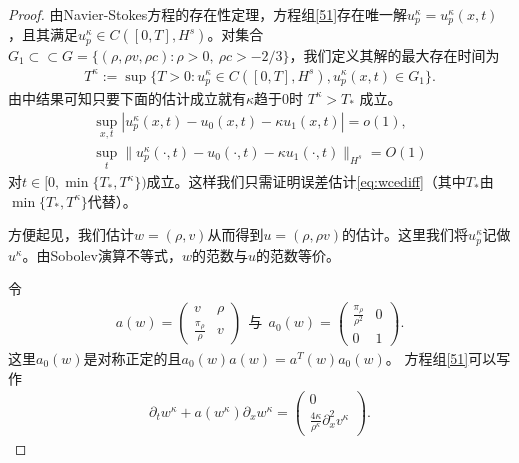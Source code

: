 \begin{proof}
由Navier-Stokes方程的存在性定理\cite{kawashima1984systems}，方程组\eqref{51}存在唯一解$u^\kappa_p=u^\kappa_p(x,t)$，且其满足$u^\kappa_p \in C([0,T],H^s)$。对集合$G_1\subset\subset G= \{(\rho, \rho v, \rho c): \rho>0,\ \rho c > -2/3\}$，我们定义其解的最大存在时间为
\begin{eqnarray*}
  T^\kappa :=\sup \{T>0 : u_p^\kappa  \in C([0,T],H^s), u^\kappa_p(x,t) \in G_1 \}.
\end{eqnarray*}
由\cite{yong2001basic}中结果可知只要下面的估计成立就有$\kappa$趋于$0$时
$T^\kappa > T_*$
成立。
\begin{eqnarray*}
\sup_{x,t} |u_p^\kappa(x,t) - u_0 (x, t) - \kappa u_1(x,t)|=o(1), \\
\sup_t \| u_p^\kappa(\cdot ,t) - u_0 (\cdot, t) - \kappa u_1(\cdot, t) \|_{H^s} = O(1)
\end{eqnarray*}
对$t \in [0,\min\{T_*,T^\kappa\})$成立。这样我们只需证明误差估计\eqref{eq:wcediff}（其中$T_*$由$\min\{T_*,T^\kappa\}$代替）。

方便起见，我们估计$w=(\rho,v)$从而得到$u=(\rho,\rho v)$的估计。这里我们将$u^\kappa_p$记做$u^\kappa$。由Sobolev演算不等式\cite{majda1984compressible}，$w$的范数与$u$的范数等价。

令
\begin{eqnarray*}
  a(w) = \left( \begin{array}{cc} v & \rho \\ \frac{\pi_\rho}{\rho} & v \end{array} \right) \ \ \mbox{与} \ \
  a_0(w) = \left( \begin{array}{cc} \frac{\pi_\rho}{\rho^2} & 0 \\ 0 & 1 \end{array} \right).
\end{eqnarray*}
这里$a_0(w)$是对称正定的且$a_0(w)a(w)=a^T(w)a_0(w)$。
方程组\eqref{51}可以写作
\begin{eqnarray}\label{57}
  \partial_t w^\kappa + a(w^\kappa) \partial_x w^\kappa = \left( \begin{array}{cc} 0 \\ \frac{4 \kappa}{\rho^\kappa} \partial^2_x v^\kappa \end{array} \right) .
\end{eqnarray}


\end{proof}
